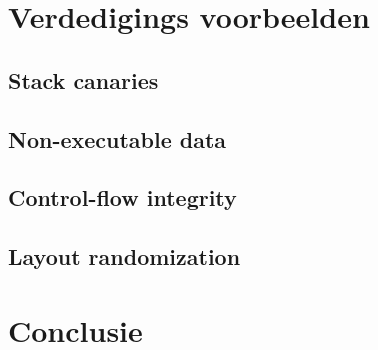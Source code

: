 \documentclass[../main.tex]{subfiles}
\begin{document}
\section{Verdedigings voorbeelden}
\subsection{Stack canaries}
\subsection{Non-executable data}
\subsection{Control-flow integrity}
\subsection{Layout randomization}
\section{Conclusie}
\end{document}
